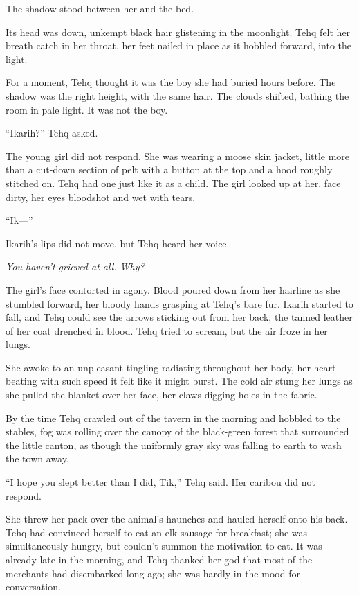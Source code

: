 The shadow stood between her and the bed.

Its head was down, unkempt black hair glistening in the moonlight. Tehq felt her breath catch in her throat, her feet nailed in place as it hobbled forward, into the light.

For a moment, Tehq thought it was the boy she had buried hours before. The shadow was the right height, with the same hair. The clouds shifted, bathing the room in pale light. It was not the boy.

``Ikarih?'' Tehq asked.

The young girl did not respond. She was wearing a moose skin jacket, little more than a cut-down section of pelt with a button at the top and a hood roughly stitched on. Tehq had one just like it as a child. The girl looked up at her, face dirty, her eyes bloodshot and wet with tears.

``Ik---''

Ikarih's lips did not move, but Tehq heard her voice.

\emph{You haven't grieved at all. Why?}

The girl's face contorted in agony. Blood poured down from her hairline as she stumbled forward, her bloody hands grasping at Tehq's bare fur. Ikarih started to fall, and Tehq could see the arrows sticking out from her back, the tanned leather of her coat drenched in blood. Tehq tried to scream, but the air froze in her lungs.

She awoke to an unpleasant tingling radiating throughout her body, her heart beating with such speed it felt like it might burst. The cold air stung her lungs as she pulled the blanket over her face, her claws digging holes in the fabric.

By the time Tehq crawled out of the tavern in the morning and hobbled to the stables, fog was rolling over the canopy of the black-green forest that surrounded the little canton, as though the uniformly gray sky was falling to earth to wash the town away.

``I hope you slept better than I did, Tik,'' Tehq said. Her caribou did not respond.

She threw her pack over the animal's haunches and hauled herself onto his back. Tehq had convinced herself to eat an elk sausage for breakfast; she was simultaneously hungry, but couldn't summon the motivation to eat. It was already late in the morning, and Tehq thanked her god that most of the merchants had disembarked long ago; she was hardly in the mood for conversation.

